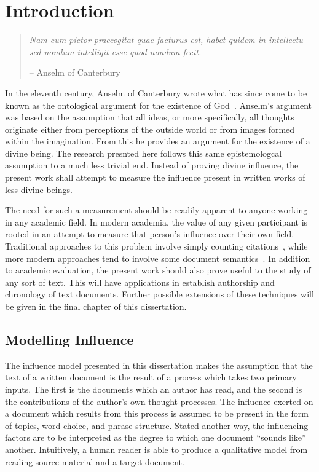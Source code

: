 \documentclass[../dissertation.tex]{subfiles}
\begin{document}
\chapter{Introduction}
\begin{quote}
\textit{Nam cum pictor praecogitat quae facturus est, habet quidem in
intellectu sed nondum intelligit esse quod nondum fecit.}

-- Anselm of Canterbury~\cite{anselm}
\end{quote}
In the eleventh century, Anselm of Canterbury wrote what has since
come to be known as the ontological argument for the existence of
God~\cite{anselm}.  Anselm's argument was based on the assumption that
all ideas, or more specifically, all thoughts originate either from
perceptions of the outside world or from images formed within the
imagination.  From this he provides an argument for the existence of
a divine being.  The research presnted here follows this same
epistemologcal assumption to a much less trivial end.
Instead of proving divine influence, the present work shall attempt to
measure the influence present in written works of less divine beings.

The need for such a measurement should be readily apparent to anyone
working in any academic field.  In modern academia, the value of any
given participant is rooted in an attempt to measure that person's
influence over their own field.  Traditional approaches to this
problem involve simply counting citations~\cite{**Use and Abuse**},
while more modern approaches tend to involve some document
semantics~\cite{**some semantic influence models**}.  In addition to
academic evaluation, the present work should also prove useful to the
study of any sort of text.  This will have applications in establish
authorship and chronology of text documents.  Further possible
extensions of these techniques will be given in the final chapter of
this dissertation.

\section{Modelling Influence}
The influence model presented in this dissertation makes the
assumption that the text of a written document is the result of
a process which takes two primary inputs.  The first is the documents
which an author has read, and the second is the contributions of the
author's own thought processes.  The influence exerted on a document
which results from this process is assumed to be present in the form
of topics, word choice, and phrase structure.  Stated another way, the
influencing factors are to be interpreted as the degree to which one
document ``sounds like'' another.  Intuitively, a human reader is able 
to produce a qualitative model from reading source material and
a target document.  
\end{document}
